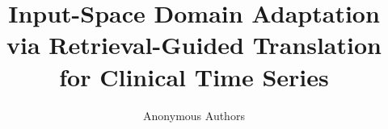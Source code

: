 \documentclass{article}
\title{Input-Space Domain Adaptation via Retrieval-Guided Translation\\for Clinical Time Series}
\author{Anonymous Authors}
\begin{document}
\maketitle




\begin{ack}
\end{ack}




\appendix


\newpage

\end{document}
